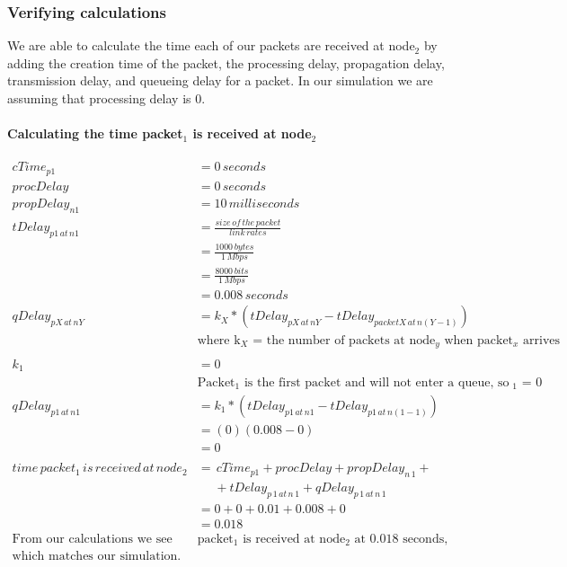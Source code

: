 \documentclass[fleqn,11pt]{article}
\begin{document}
\subsubsection{Verifying calculations}
We are able to calculate the time each of our packets are received at node$_2$ by adding the creation time of the packet, the processing delay, propagation delay, transmission delay, and queueing delay for a packet. In our simulation we are assuming that processing delay is 0. 

\paragraph{Calculating the time packet$_1$ is received at node$_2$ }
\begin{align*}
cTime_{p1} &= 0\,seconds\\
procDelay &= 0\,seconds\\
propDelay_{n1} &= 10\,milliseconds\\
tDelay_{p1\,at\,n1} &=  \frac{size\,of\,the\,packet} {link\,rates}\\
&= \frac{1000\,bytes} {1\,Mbps}\\
&=  \frac{8000\,bits} {1\,Mbps}\\
&= 0.008 \,seconds\\
qDelay_{pX\,at\,nY} &= k_{X}*(tDelay_{pX\,at\,nY} - tDelay_{packetX\,at\,n(Y-1)}) \\
&\text{where k$_X$ = the number of packets at node$_y$ when packet$_x$ arrives}\\
\\
k_{1} &= 0\\
&\text{Packet$_1$ is the first packet and will not enter a queue, so k$_1$ = 0} \\
qDelay_{p1\,at\,n1} &= k_{1}*(tDelay_{p1\,at\,n1} - tDelay_{p1\,at\,n(1-1)})\\
&= (0) (0.008 - 0) \\
&= 0 \\
\\
time\,packet_{1}\,is\,received\,at\,node_{2} &= \,cTime_{p1} + procDelay + propDelay_{n\,1} +\\
&\,\,\,\,\,\,\,\, + tDelay_{p\,1\,at\,n\,1} + qDelay_{p\,1\,at\,n\,1} \\
&= 0 + 0 + 0.01 + 0.008 + 0 \\
&= 0.018\\
\text{From our calculations we see that }
&\text{packet$_1$ is received at node$_2$ at 0.018 seconds,} \\
\text{which matches our simulation.}
\end{align*}
\end{document}
